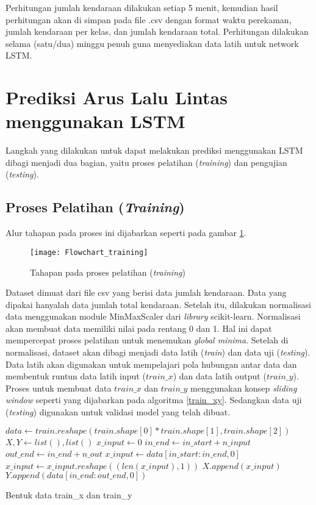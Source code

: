 \documentclass[../thesis.tex]{subfiles}
\begin{document}
Perhitungan jumlah kendaraan dilakukan setiap 5 menit, kemudian hasil perhitungan akan di simpan pada file .csv dengan format waktu perekaman, jumlah kendaraan per kelas, dan jumlah kendaraan total. Perhitungan dilakukan selama (satu/dua) minggu penuh guna menyediakan data latih untuk network LSTM.  

\section{Prediksi Arus Lalu Lintas menggunakan LSTM}
Langkah yang dilakukan untuk dapat melakukan prediksi menggunakan LSTM dibagi menjadi dua bagian, yaitu proses pelatihan (\textit{training}) dan pengujian (\textit{testing}).
\subsection{Proses Pelatihan (\textit{Training})}
Alur tahapan pada proses ini dijabarkan seperti pada gambar \ref{lstm_training}.
\begin{figure}
	\centering
	\texttt{[image: Flowchart\_training]}
	\caption{Tahapan pada proses pelatihan (\textit{training})}
	\label{lstm_training}
\end{figure}
Dataset dimuat dari file csv yang berisi data jumlah kendaraan. Data yang dipakai hanyalah data jumlah total kendaraan. Setelah itu, dilakukan normalisasi data menggunakan module MinMaxScaler dari \textit{library} scikit-learn. Normalisasi akan membuat data memiliki nilai pada rentang 0 dan 1. Hal ini dapat mempercepat proses pelatihan untuk menemukan \textit{global minima}.
Setelah di normalisasi, dataset akan dibagi menjadi data latih (\textit{train}) dan data uji (\textit{testing}). Data latih akan digunakan untuk mempelajari pola hubungan antar data dan membentuk runtun data latih input ($train\_x$) dan data latih output ($train\_y$). Proses untuk membuat data $train\_x$ dan $train\_y$ menggunakan konsep \textit{sliding window} seperti yang dijabarkan pada algoritma \ref{train_xy}. Sedangkan data uji (\textit{testing}) digunakan untuk validasi model yang telah dibuat.

\begin{algorithm}[htp]
	\begin{algorithmic}[1]
		\State $data \leftarrow train.reshape(train.shape[0]*train.shape[1], train.shape[2])$
		\State $X, Y \leftarrow list(), list()$
		\State $x\_input \leftarrow 0$
			\State $in\_end \leftarrow in\_start + n\_input$
			\State $out\_end \leftarrow in\_end + n\_out$
				\State $x\_input \leftarrow data[in\_start: in\_end, 0]$
				\State $x\_input \leftarrow x\_input.reshape((len(x\_input), 1))$
				\State $X.append(x\_input)$
				\State $Y.append(data[in\_end:out\_end, 0])$
			\EndIf
		\EndFor
	\EndFunction
	\end{algorithmic}
	\caption{Bentuk data train_x dan train_y}
	\label{train_xy}
\end{algorithm}
	
\end{document}
